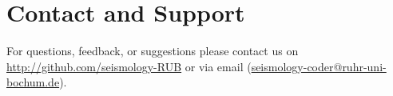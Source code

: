 \chapter{Contact and Support}
\label{contact and support}
For questions, feedback, or suggestions please contact us on \url{http://github.com/seismology-RUB} or via email (\url{seismology-coder@ruhr-uni-bochum.de}).